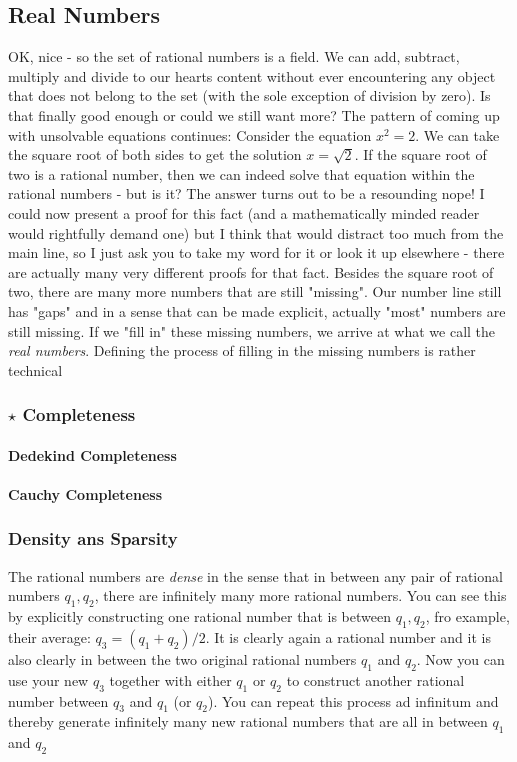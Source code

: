 \subsection{Real Numbers}
OK, nice - so the set of rational numbers is a field. We can add, subtract, multiply and divide to our hearts content without ever encountering any object that does not belong to the set (with the sole exception of division by zero). Is that finally good enough or could we still want more? The pattern of coming up with unsolvable equations continues: Consider the equation $x^2 = 2$. We can take the square root of both sides to get the solution $x = \sqrt{2}$. If the square root of two is a rational number, then we can indeed solve that equation within the rational numbers - but is it? The answer turns out to be a resounding nope! I could now present a proof for this fact (and a mathematically minded reader would rightfully demand one) but I think that would distract too much from the main line, so I just ask you to take my word for it or look it up elsewhere - there are actually many very different proofs for that fact. Besides the square root of two, there are many more numbers that are still "missing". Our number line still has "gaps" and in a sense that can be made explicit, actually "most" numbers are still missing. If we "fill in" these missing numbers, we arrive at what we call the \emph{real numbers}. Defining the process of filling in the missing numbers is rather technical 

\subsubsection{$\star$ Completeness}

\paragraph{Dedekind Completeness}

\paragraph{Cauchy Completeness}


\subsubsection{Density ans Sparsity}
The rational numbers are \emph{dense} in the sense that in between any pair of rational numbers $q_1, q_2$, there are infinitely many more  rational numbers. You can see this by explicitly constructing one rational number that is between $q_1, q_2$, fro example, their average: $q_3 = (q_1 + q_2) / 2$. It is clearly again a rational number and it is also clearly in between the two original rational numbers $q_1$ and $q_2$. Now you can use your new $q_3$ together with either $q_1$ or $q_2$ to construct another rational number between $q_3$ and $q_1$ (or $q_2$). You can repeat this process ad infinitum and thereby generate infinitely many new rational numbers that are all in between $q_1$ and $q_2$

